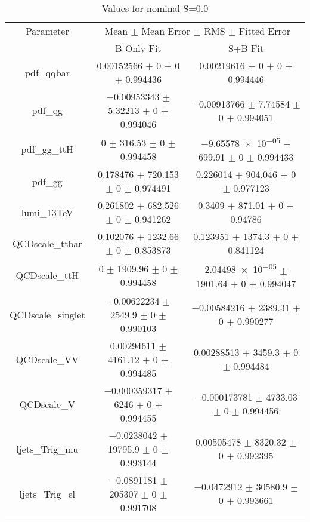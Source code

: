 \begin{table}
\centering
\caption{Values for nominal S=0.0}
\begin{tabular}{ccc}
\toprule
Parameter & \multicolumn{2}{c}{Mean $\pm$ Mean Error $\pm$ RMS $\pm$ Fitted Error}\\
 & B-Only Fit & S+B Fit\\
\midrule
pdf\_qqbar & \num{0.00152566} $\pm$ \num{0} $\pm$ \num{0} $\pm$ \num{0.994436} & \num{0.00219616} $\pm$ \num{0} $\pm$ \num{0} $\pm$ \num{0.994446}\\
pdf\_qg & \num{-0.00953343} $\pm$ \num{5.32213} $\pm$ \num{0} $\pm$ \num{0.994046} & \num{-0.00913766} $\pm$ \num{7.74584} $\pm$ \num{0} $\pm$ \num{0.994051}\\
pdf\_gg\_ttH & \num{0} $\pm$ \num{316.53} $\pm$ \num{0} $\pm$ \num{0.994458} & \num{-9.65578e-05} $\pm$ \num{699.91} $\pm$ \num{0} $\pm$ \num{0.994433}\\
pdf\_gg & \num{0.178476} $\pm$ \num{720.153} $\pm$ \num{0} $\pm$ \num{0.974491} & \num{0.226014} $\pm$ \num{904.046} $\pm$ \num{0} $\pm$ \num{0.977123}\\
lumi\_13TeV & \num{0.261802} $\pm$ \num{682.526} $\pm$ \num{0} $\pm$ \num{0.941262} & \num{0.3409} $\pm$ \num{871.01} $\pm$ \num{0} $\pm$ \num{0.94786}\\
QCDscale\_ttbar & \num{0.102076} $\pm$ \num{1232.66} $\pm$ \num{0} $\pm$ \num{0.853873} & \num{0.123951} $\pm$ \num{1374.3} $\pm$ \num{0} $\pm$ \num{0.841124}\\
QCDscale\_ttH & \num{0} $\pm$ \num{1909.96} $\pm$ \num{0} $\pm$ \num{0.994458} & \num{2.04498e-05} $\pm$ \num{1901.64} $\pm$ \num{0} $\pm$ \num{0.994047}\\
QCDscale\_singlet & \num{-0.00622234} $\pm$ \num{2549.9} $\pm$ \num{0} $\pm$ \num{0.990103} & \num{-0.00584216} $\pm$ \num{2389.31} $\pm$ \num{0} $\pm$ \num{0.990277}\\
QCDscale\_VV & \num{0.00294611} $\pm$ \num{4161.12} $\pm$ \num{0} $\pm$ \num{0.994485} & \num{0.00288513} $\pm$ \num{3459.3} $\pm$ \num{0} $\pm$ \num{0.994484}\\
QCDscale\_V & \num{-0.000359317} $\pm$ \num{6246} $\pm$ \num{0} $\pm$ \num{0.994455} & \num{-0.000173781} $\pm$ \num{4733.03} $\pm$ \num{0} $\pm$ \num{0.994456}\\
ljets\_Trig\_mu & \num{-0.0238042} $\pm$ \num{19795.9} $\pm$ \num{0} $\pm$ \num{0.993144} & \num{0.00505478} $\pm$ \num{8320.32} $\pm$ \num{0} $\pm$ \num{0.992395}\\
ljets\_Trig\_el & \num{-0.0891181} $\pm$ \num{205307} $\pm$ \num{0} $\pm$ \num{0.991708} & \num{-0.0472912} $\pm$ \num{30580.9} $\pm$ \num{0} $\pm$ \num{0.993661}\\

\end{tabular}
\end{table}
